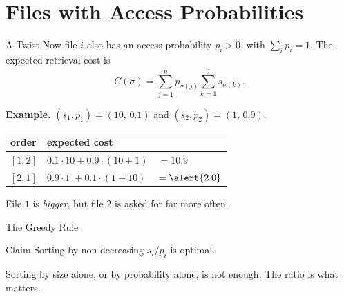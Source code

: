 \documentclass[10pt,aspectratio=169]{beamer}
\begin{document}
\section{Files with Access Probabilities}

\begin{frame}{A Twist}
  Now file $i$ also has an access probability $p_i > 0$, with
  $\sum_i p_i = 1$. The \alert{expected} retrieval cost is
  \[
    C(\sigma) = \sum_{j=1}^{n} p_{\sigma(j)} \sum_{k=1}^{j} s_{\sigma(k)}.
  \]

  \pause
  \bigskip
  \textbf{Example.} $(s_1, p_1) = (10,\, 0.1)$ and $(s_2, p_2) = (1,\, 0.9)$.

  \bigskip
  \begin{center}
  \begin{tabular}{lll}
    \toprule
    order & expected cost & \\
    \midrule
    $[1,2]$ & $0.1 \cdot 10 + 0.9 \cdot (10+1)$ & $= 10.9$ \\
    $[2,1]$ & $0.9 \cdot 1 \; + 0.1 \cdot (1+10)$ & $= \alert{2.0}$ \\
    \bottomrule
  \end{tabular}
  \end{center}

  \bigskip
  \begin{center}
    File $1$ is \emph{bigger}, but file $2$ is asked for far more often.
  \end{center}
\end{frame}

\begin{frame}{The Greedy Rule}
  \begin{block}{Claim}
    Sorting by \alert{non-decreasing $s_i / p_i$} is optimal.
  \end{block}

  \bigskip
  \begin{center}
  \end{center}

  \bigskip
  \begin{center}
    Sorting by size alone, or by probability alone, is not enough.
    The \alert{ratio} is what matters.
  \end{center}
\end{frame}
\end{document}
